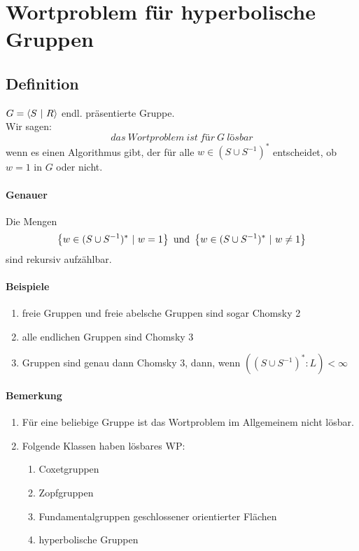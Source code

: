 \documentclass{article}
\begin{document}
\newpage
\section{Wortproblem für hyperbolische Gruppen}

\subsection{Definition}
$G = \grp{S}{R}$ endl. präsentierte Gruppe.\\
Wir sagen:
\[das~Wortproblem ~ist ~für ~G ~lösbar\]
wenn es einen Algorithmus gibt, der für alle $w \in (S\cup S^{-1})^*$ entscheidet, ob $w= 1$ in $G$ oder nicht.\\
\paragraph{Genauer} Die Mengen 
\[\set{w \in (S\cup S^{-1})^*}{w = 1} \text{ und } \set{w \in (S\cup S^{-1})^*}{w \neq 1}\]
sind rekursiv aufzählbar.

\paragraph{Beispiele}
\begin{enumerate}
	\item freie Gruppen und freie abelsche Gruppen sind sogar Chomsky 2
	\item alle endlichen Gruppen sind Chomsky 3
	\item Gruppen sind genau dann Chomsky 3, dann, wenn $((S\cup S^{-1})^* : L) < \infty$
\end{enumerate}

\paragraph{Bemerkung}
\begin{enumerate}
	\item Für eine beliebige Gruppe ist das Wortproblem im Allgemeinem nicht lösbar.
	\item Folgende Klassen haben lösbares WP:
	\begin{enumerate}
		\item Coxetgruppen
		\item Zopfgruppen
		\item Fundamentalgruppen geschlossener orientierter Flächen
		\item hyperbolische Gruppen
	\end{enumerate}
\end{enumerate}
\end{document}
